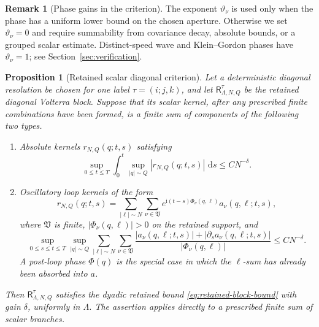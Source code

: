 \documentclass[11pt,reqno]{amsart}
\numberwithin{equation}{section}
\theoremstyle{plain}
\newtheorem{proposition}[theorem]{Proposition}
\theoremstyle{definition}
\newtheorem{remark}[theorem]{Remark}
\newcommand{\dd}{\,\mathrm d}
\newcommand{\ii}{\mathrm i}
\newcommand{\Ret}{\mathsf R}
\begin{document}
\begin{remark}[Phase gains in the criterion]\label{rem:phase-gains}
The exponent \(\vartheta_\nu\) is used only when the phase has a uniform
lower bound on the chosen aperture.  Otherwise we set
\(\vartheta_\nu=0\) and require summability from covariance decay,
absolute bounds, or a grouped scalar estimate.  Distinct-speed wave and
Klein--Gordon phases have \(\vartheta_\nu=1\); see
Section~\ref{sec:verification}.
\end{remark}

\begin{proposition}[Retained scalar diagonal criterion]\label{prop:symbol-criterion}
Let a deterministic diagonal resolution be chosen for one label
\(\tau=(i;j,k)\), and let \(\Ret_{\Lambda,N,Q}^\tau\) be the retained
diagonal Volterra block.  Suppose that its scalar kernel, after any
prescribed finite combinations have been formed, is a finite sum of
components of the following two types.
\begin{enumerate}[label=(\alph*),leftmargin=2.2em]
\item Absolute kernels \(r_{N,Q}(q;t,s)\) satisfying
\begin{equation}\label{eq:absolute-symbol-criterion}
        \sup_{0\le t\le T}\int_0^t
        \sup_{|q|\sim Q}|r_{N,Q}(q;t,s)|\,\dd s
        \le C N^{-\delta} .
\end{equation}
\item Oscillatory loop kernels of the form
\begin{equation}\label{eq:osc-loop-kernel}
        r_{N,Q}(q;t,s)
        =\sum_{|\ell|\sim N}\sum_{\nu\in\mathfrak V}
        e^{\ii(t-s)\Phi_\nu(q,\ell)}a_\nu(q,\ell;t,s),
\end{equation}
where \(\mathfrak V\) is finite, \(|\Phi_\nu(q,\ell)|>0\) on the retained support, and
\begin{equation}\label{eq:osc-symbol-criterion}
        \sup_{0\le s\le t\le T}\sup_{|q|\sim Q}
        \sum_{|\ell|\sim N}\sum_{\nu\in\mathfrak V}
        \frac{|a_\nu(q,\ell;t,s)|+|\partial_sa_\nu(q,\ell;t,s)|}{|\Phi_\nu(q,\ell)|}
        \le C N^{-\delta} .
\end{equation}
A post-loop phase \(\Phi(q)\) is the special case in which the \(\ell\)-sum has already been absorbed into \(a\).
\end{enumerate}
Then \(\Ret_{\Lambda,N,Q}^\tau\) satisfies the dyadic retained bound
\eqref{eq:retained-block-bound} with gain \(\delta\), uniformly in
\(\Lambda\).  The assertion applies directly to a prescribed finite sum of
scalar branches.
\end{proposition}
\end{document}
